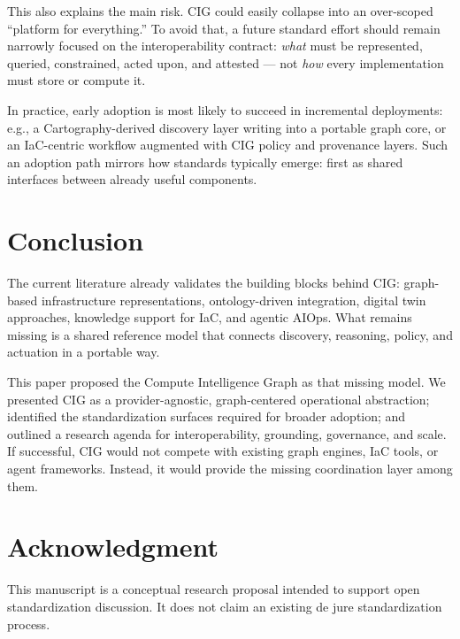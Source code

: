 \documentclass[conference]{IEEEtran}
\begin{document}
This also explains the main risk. CIG could easily collapse into an over-scoped “platform for everything.” To avoid that, a future standard effort should remain narrowly focused on the interoperability contract: \emph{what} must be represented, queried, constrained, acted upon, and attested --- not \emph{how} every implementation must store or compute it.

In practice, early adoption is most likely to succeed in incremental deployments: e.g., a Cartography-derived discovery layer writing into a portable graph core, or an IaC-centric workflow augmented with CIG policy and provenance layers. Such an adoption path mirrors how standards typically emerge: first as shared interfaces between already useful components.

\section{Conclusion}
The current literature already validates the building blocks behind CIG: graph-based infrastructure representations, ontology-driven integration, digital twin approaches, knowledge support for IaC, and agentic AIOps. What remains missing is a shared reference model that connects discovery, reasoning, policy, and actuation in a portable way.

This paper proposed the Compute Intelligence Graph as that missing model. We presented CIG as a provider-agnostic, graph-centered operational abstraction; identified the standardization surfaces required for broader adoption; and outlined a research agenda for interoperability, grounding, governance, and scale. If successful, CIG would not compete with existing graph engines, IaC tools, or agent frameworks. Instead, it would provide the missing coordination layer among them.

\section*{Acknowledgment}
This manuscript is a conceptual research proposal intended to support open standardization discussion. It does not claim an existing de jure standardization process.



\end{document}
